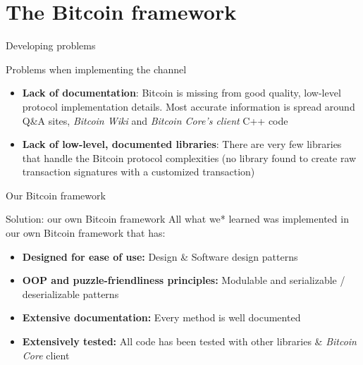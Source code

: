 \documentclass{beamer}
\begin{document}
\section{The Bitcoin framework}
\begin{frame}{Developing problems}
 \begin{alertblock}{Problems when implementing the channel}
  \begin{itemize}[<+->]
   \item \textbf{Lack of documentation}: Bitcoin is missing from good quality, low-level protocol implementation details. Most accurate information is spread around Q\&A sites, \textit{Bitcoin Wiki} and \textit{Bitcoin Core's client} C++ code
   \item \textbf{Lack of low-level, documented libraries}: There are very few libraries that handle the Bitcoin protocol complexities (no library found to create raw transaction signatures with a customized transaction)
  \end{itemize}
 \end{alertblock}
\end{frame}
\begin{frame}{Our Bitcoin framework}
 \begin{exampleblock}{Solution: our own Bitcoin framework}
  All what we* learned was implemented in our own Bitcoin framework that has:
  \begin{itemize}[<+->]
   \item \textbf{Designed for ease of use:} Design \& Software design patterns
   \item \textbf{OOP and puzzle-friendliness principles:} Modulable and serializable / deserializable patterns
   \item \textbf{Extensive documentation:} Every method is well documented
   \item \textbf{Extensively tested:} All code has been tested with other libraries \& \textit{Bitcoin Core} client
  \end{itemize}
 \end{exampleblock}
\end{frame}
\end{document}
